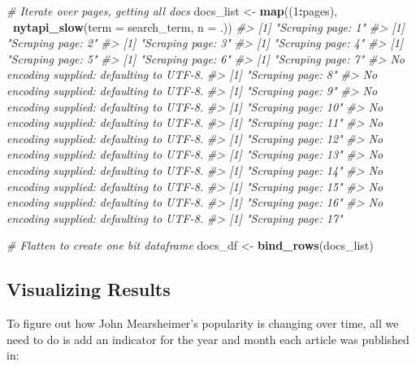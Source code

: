 \documentclass[]{book}
\newenvironment{Shaded}{\begin{snugshade}}{\end{snugshade}}
\newcommand{\KeywordTok}[1]{\textcolor[rgb]{0.13,0.29,0.53}{\textbf{#1}}}
\newcommand{\DataTypeTok}[1]{\textcolor[rgb]{0.13,0.29,0.53}{#1}}
\newcommand{\DecValTok}[1]{\textcolor[rgb]{0.00,0.00,0.81}{#1}}
\newcommand{\StringTok}[1]{\textcolor[rgb]{0.31,0.60,0.02}{#1}}
\newcommand{\CommentTok}[1]{\textcolor[rgb]{0.56,0.35,0.01}{\textit{#1}}}
\newcommand{\OperatorTok}[1]{\textcolor[rgb]{0.81,0.36,0.00}{\textbf{#1}}}
\newcommand{\NormalTok}[1]{#1}
\begin{document}
\begin{Shaded}
\begin{Highlighting}[]
\CommentTok{# Iterate over pages, getting all docs}
\NormalTok{docs_list <-}\StringTok{ }\KeywordTok{map}\NormalTok{((}\DecValTok{1}\OperatorTok{:}\NormalTok{pages), }\OperatorTok{~}\KeywordTok{nytapi_slow}\NormalTok{(}\DataTypeTok{term =}\NormalTok{ search_term, }\DataTypeTok{n =}\NormalTok{ .))}
\CommentTok{#> [1] "Scraping page:  1"}
\CommentTok{#> [1] "Scraping page:  2"}
\CommentTok{#> [1] "Scraping page:  3"}
\CommentTok{#> [1] "Scraping page:  4"}
\CommentTok{#> [1] "Scraping page:  5"}
\CommentTok{#> [1] "Scraping page:  6"}
\CommentTok{#> [1] "Scraping page:  7"}
\CommentTok{#> No encoding supplied: defaulting to UTF-8.}
\CommentTok{#> [1] "Scraping page:  8"}
\CommentTok{#> No encoding supplied: defaulting to UTF-8.}
\CommentTok{#> [1] "Scraping page:  9"}
\CommentTok{#> No encoding supplied: defaulting to UTF-8.}
\CommentTok{#> [1] "Scraping page:  10"}
\CommentTok{#> No encoding supplied: defaulting to UTF-8.}
\CommentTok{#> [1] "Scraping page:  11"}
\CommentTok{#> No encoding supplied: defaulting to UTF-8.}
\CommentTok{#> [1] "Scraping page:  12"}
\CommentTok{#> No encoding supplied: defaulting to UTF-8.}
\CommentTok{#> [1] "Scraping page:  13"}
\CommentTok{#> No encoding supplied: defaulting to UTF-8.}
\CommentTok{#> [1] "Scraping page:  14"}
\CommentTok{#> No encoding supplied: defaulting to UTF-8.}
\CommentTok{#> [1] "Scraping page:  15"}
\CommentTok{#> No encoding supplied: defaulting to UTF-8.}
\CommentTok{#> [1] "Scraping page:  16"}
\CommentTok{#> No encoding supplied: defaulting to UTF-8.}
\CommentTok{#> [1] "Scraping page:  17"}

\CommentTok{# Flatten to create one bit dataframe}
\NormalTok{docs_df <-}\StringTok{ }\KeywordTok{bind_rows}\NormalTok{(docs_list)}
\end{Highlighting}
\end{Shaded}

\subsection{Visualizing Results}\label{visualizing-results}

To figure out how John Mearsheimer's popularity is changing over time,
all we need to do is add an indicator for the year and month each
article was published in:
\end{document}
